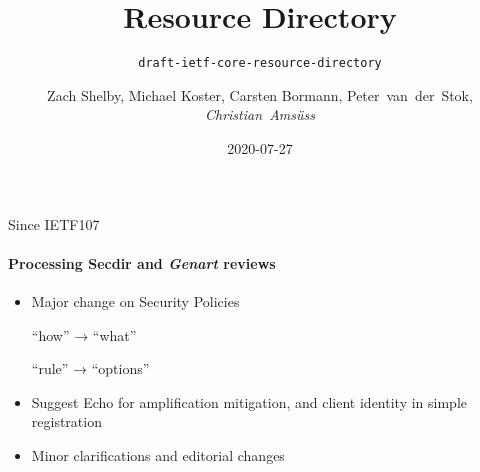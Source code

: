 \documentclass[aspectratio=169]{beamer}
\title{Resource Directory}
\subtitle{\texttt{draft-ietf-core-resource-directory}}
\author{Zach Shelby, Michael Koster, Carsten Bormann, Peter~van~der~Stok, \textit{Christian~Amsüss}}
\date{2020-07-27}
\begin{document}
\frame{\titlepage}

\begin{frame}{Since IETF107}\Large
	\framesubtitle{Processing Secdir and {\em Genart} reviews}

	\begin{itemize}
		\item Major change on Security Policies\bigskip


			“how” → “what”\bigskip

			“rule” → “options”\bigskip

		\item Suggest Echo for amplification mitigation, and client identity in simple registration
		\item Minor clarifications and editorial changes
	\end{itemize}
\end{frame}
\end{document}
